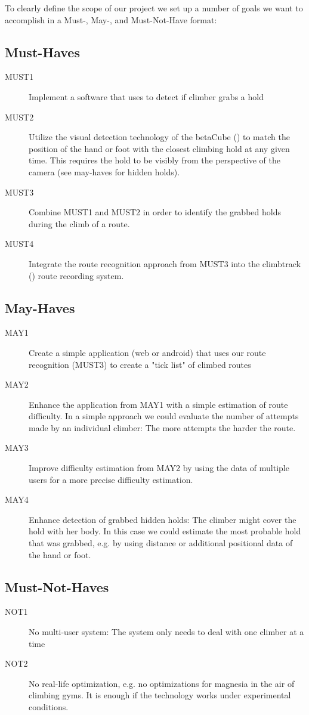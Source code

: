 To clearly define the scope of our project we set up a number of goals we want to accomplish in a Must-, May-, and Must-Not-Have format:

\subsection{Must-Haves}
\begin{description}
	\item[MUST1] Implement a software that uses  to detect if climber grabs a hold
	\item[MUST2] Utilize the visual detection technology of the betaCube () to match the position of the hand or foot with the closest climbing hold at any given time. This requires the hold to be visibly from the perspective of the camera (see may-haves for hidden holds).
	\item[MUST3] Combine MUST1 and MUST2 in order to identify the grabbed holds during the climb of a route.
	\item[MUST4] Integrate the route recognition approach from MUST3 into the climbtrack () route recording system.
\end{description}
\subsection{May-Haves}
\begin{description}
	\item[MAY1] Create a simple application (web or android) that uses our route recognition (MUST3) to create a "tick list" of climbed routes
	\item[MAY2] Enhance the application from MAY1 with a simple estimation of route difficulty. In a simple approach we could evaluate the number of attempts made by an individual climber: The more attempts the harder the route.
	\item[MAY3] Improve difficulty estimation from MAY2 by using the data of multiple users for a more precise difficulty estimation.
	\item[MAY4] Enhance detection of grabbed hidden holds: The climber might cover the hold with her body. In this case we could estimate the most probable hold that was grabbed, e.g. by using distance or additional positional data of the hand or foot.
\end{description}
\subsection{Must-Not-Haves}
\begin{description}
	\item[NOT1] No multi-user system: The system only needs to deal with one climber at a time
	\item[NOT2] No real-life optimization, e.g. no optimizations for magnesia in the air of climbing gyms. It is enough if the technology works under experimental conditions.
\end{description}
